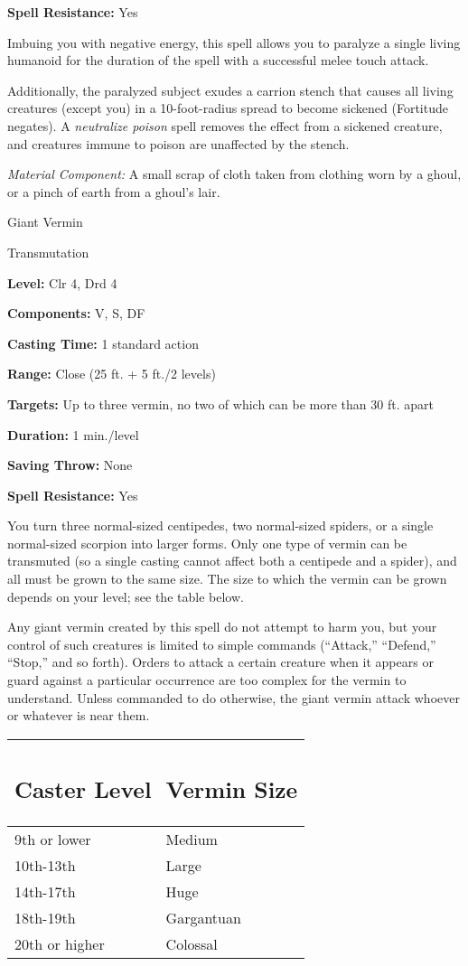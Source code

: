 \documentclass{article}
\begin{document}
\textbf{Spell Resistance:} Yes

Imbuing you with negative energy, this spell allows you to paralyze a single living 
humanoid for the duration of the spell with a successful melee touch attack.

Additionally, the paralyzed subject exudes a carrion stench that causes all living 
creatures (except you) in a 10-foot-radius spread to become sickened (Fortitude 
negates). A \textit{neutralize poison }spell removes the effect from a sickened 
creature, and creatures immune to poison are unaffected by the stench.

\textit{Material Component: }A small scrap of cloth taken from clothing worn by 
a ghoul, or a pinch of earth from a ghoul's lair.

\vspace{12pt}
Giant Vermin

Transmutation

\textbf{Level:} Clr 4, Drd 4

\textbf{Components:} V, S, DF

\textbf{Casting Time:} 1 standard action

\textbf{Range:} Close (25 ft. + 5 ft./2 levels)

\textbf{Targets:} Up to three vermin, no two of which can be more than 30 ft. apart

\textbf{Duration:} 1 min./level

\textbf{Saving Throw:} None

\textbf{Spell Resistance:} Yes

You turn three normal-sized centipedes, two normal-sized spiders, or a single normal-sized 
scorpion into larger forms. Only one type of vermin can be transmuted (so a single 
casting cannot affect both a centipede and a spider), and all must be grown to 
the same size. The size to which the vermin can be grown depends on your level; 
see the table below.

Any giant vermin created by this spell do not attempt to harm you, but your control 
of such creatures is limited to simple commands (``Attack,'' ``Defend,'' ``Stop,'' 
and so forth). Orders to attack a certain creature when it appears or guard against 
a particular occurrence are too complex for the vermin to understand. Unless commanded 
to do otherwise, the giant vermin attack whoever or whatever is near them.

\begin{tabular}{|>{\raggedright}p{55pt}|>{\raggedright}p{51pt}|}
\hline
\subsection*{C\textbf{aster Level}} & \subsection*{V\textbf{ermin Size}}\tabularnewline
\hline
9th or lower & Medium\tabularnewline
\hline
10th-13th & Large\tabularnewline
\hline
14th-17th & Huge\tabularnewline
\hline
18th-19th & Gargantuan\tabularnewline
\hline
20th or higher & Colossal\tabularnewline
\hline
\end{tabular}
\end{document}
